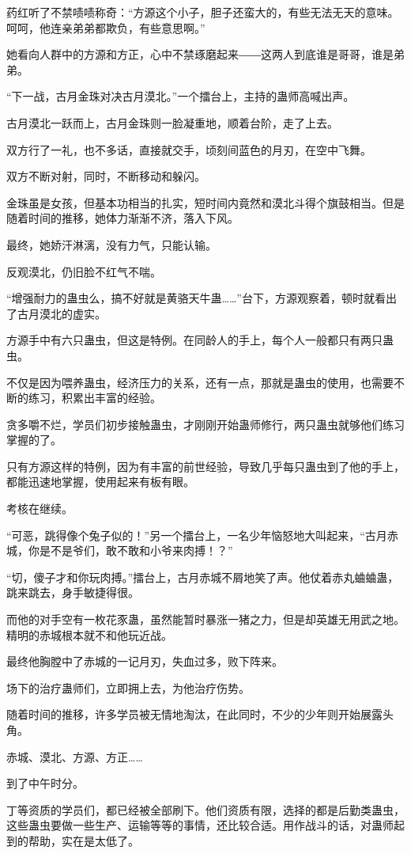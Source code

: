 \begin{this_body}
药红听了不禁啧啧称奇：“方源这个小子，胆子还蛮大的，有些无法无天的意味。呵呵，他连亲弟弟都欺负，有些意思啊。”

她看向人群中的方源和方正，心中不禁琢磨起来――这两人到底谁是哥哥，谁是弟弟。

“下一战，古月金珠对决古月漠北。”一个擂台上，主持的蛊师高喊出声。

古月漠北一跃而上，古月金珠则一脸凝重地，顺着台阶，走了上去。

双方行了一礼，也不多话，直接就交手，顷刻间蓝色的月刃，在空中飞舞。

双方不断对射，同时，不断移动和躲闪。

金珠虽是女孩，但基本功相当的扎实，短时间内竟然和漠北斗得个旗鼓相当。但是随着时间的推移，她体力渐渐不济，落入下风。

最终，她娇汗淋漓，没有力气，只能认输。

反观漠北，仍旧脸不红气不喘。

“增强耐力的蛊虫么，搞不好就是黄骆天牛蛊……”台下，方源观察着，顿时就看出了古月漠北的虚实。

方源手中有六只蛊虫，但这是特例。在同龄人的手上，每个人一般都只有两只蛊虫。

不仅是因为喂养蛊虫，经济压力的关系，还有一点，那就是蛊虫的使用，也需要不断的练习，积累出丰富的经验。

贪多嚼不烂，学员们初步接触蛊虫，才刚刚开始蛊师修行，两只蛊虫就够他们练习掌握的了。

只有方源这样的特例，因为有丰富的前世经验，导致几乎每只蛊虫到了他的手上，都能迅速地掌握，使用起来有板有眼。

考核在继续。

“可恶，跳得像个兔子似的！”另一个擂台上，一名少年恼怒地大叫起来，“古月赤城，你是不是爷们，敢不敢和小爷来肉搏！？”

“切，傻子才和你玩肉搏。”擂台上，古月赤城不屑地笑了声。他仗着赤丸蛐蛐蛊，跳来跳去，身手敏捷得很。

而他的对手空有一枚花豕蛊，虽然能暂时暴涨一猪之力，但是却英雄无用武之地。精明的赤城根本就不和他玩近战。

最终他胸膛中了赤城的一记月刃，失血过多，败下阵来。

场下的治疗蛊师们，立即拥上去，为他治疗伤势。

随着时间的推移，许多学员被无情地淘汰，在此同时，不少的少年则开始展露头角。

赤城、漠北、方源、方正……

到了中午时分。

丁等资质的学员们，都已经被全部刷下。他们资质有限，选择的都是后勤类蛊虫，这些蛊虫要做一些生产、运输等等的事情，还比较合适。用作战斗的话，对蛊师起到的帮助，实在是太低了。


\end{this_body}

